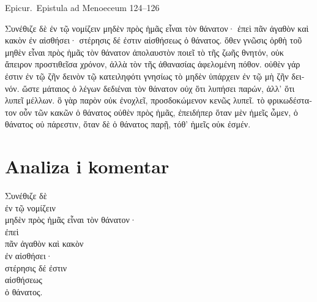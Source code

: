 Epicur.\ Epistula ad Menoeceum 124–126


\medskip


{\large

\begin{greek}

\noindent Συνέθιζε δὲ ἐν τῷ νομίζειν μηδὲν πρὸς ἡμᾶς εἶναι τὸν θάνατον· ἐπεὶ πᾶν ἀγαθὸν καὶ κακὸν ἐν αἰσθήσει· στέρησις δέ ἐστιν αἰσθήσεως ὁ θάνατος. ὅθεν γνῶσις ὀρθὴ τοῦ μηθὲν εἶναι πρὸς ἡμᾶς τὸν θάνατον ἀπολαυστὸν ποιεῖ τὸ τῆς ζωῆς θνητόν, οὐκ ἄπειρον προστιθεῖσα χρόνον, ἀλλὰ τὸν τῆς ἀθανασίας ἀφελομένη πόθον. οὐθὲν γάρ ἐστιν ἐν τῷ ζῆν δεινὸν τῷ κατειληφότι γνησίως τὸ μηδὲν ὑπάρχειν ἐν τῷ μὴ ζῆν δεινόν. ὥστε μάταιος ὁ λέγων δεδιέναι τὸν θάνατον οὐχ ὅτι λυπήσει παρών, ἀλλ' ὅτι λυπεῖ μέλλων. ὃ γὰρ παρὸν οὐκ ἐνοχλεῖ, προσδοκώμενον κενῶς λυπεῖ. τὸ φρικωδέστατον οὖν τῶν κακῶν ὁ θάνατος οὐθὲν πρὸς ἡμᾶς, ἐπειδήπερ ὅταν μὲν ἡμεῖς ὦμεν, ὁ θάνατος οὐ πάρεστιν, ὅταν δὲ ὁ θάνατος παρῇ, τόθ' ἡμεῖς οὐκ ἐσμέν.

\end{greek}

}


\section*{Analiza i komentar}


{\large
\begin{greek}
\noindent Συνέθιζε δὲ \\
\tabto{2em} ἐν τῷ νομίζειν \\
μηδὲν πρὸς ἡμᾶς εἶναι τὸν θάνατον· \\
ἐπεὶ \\
\tabto{2em} πᾶν ἀγαθὸν καὶ κακὸν \\
\tabto{2em} ἐν αἰσθήσει· \\
στέρησις δέ ἐστιν \\
\tabto{2em} αἰσθήσεως \\
ὁ θάνατος.\\

\end{greek}
}

\newpage

